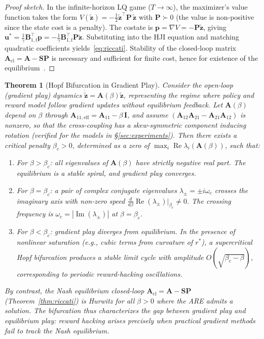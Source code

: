 \documentclass[10pt]{article}
\newcommand{\bz}{\bm{z}}
\newcommand{\bu}{\bm{u}}
\newcommand{\bp}{\bm{p}}
\newcommand{\bA}{\bm{A}}
\newcommand{\bB}{\bm{B}}
\newcommand{\bP}{\bm{P}}
\newcommand{\bI}{\bm{I}}
\newcommand{\bS}{\bm{S}}
\newtheorem{theorem}{Theorem}
\begin{document}
\begin{proof}[Proof sketch]
In the infinite-horizon LQ game ($T \to \infty$), the maximizer's value function takes the form $V(\tilde{\bz}) = -\tfrac{1}{2}\tilde{\bz}^\top \bP\,\tilde{\bz}$ with $\bP \succ 0$ (the value is non-positive since the state cost is a penalty).
The costate is $\bp = \nabla V = -\bP\tilde{\bz}$, giving $\bu^* = \tfrac{1}{\gamma}\bB_{1,\mathrm{f}}^\top \bp = -\tfrac{1}{\gamma}\bB_{1,\mathrm{f}}^\top \bP\tilde{\bz}$.
Substituting into the HJI equation and matching quadratic coefficients yields~\eqref{eq:riccati}.
Stability of the closed-loop matrix $\bA_{\mathrm{cl}} = \bA - \bS\bP$ is necessary and sufficient for finite cost, hence for existence of the equilibrium~\citep{basar1999dynamic}.
\end{proof}

\begin{theorem}[Hopf Bifurcation in Gradient Play]
\label{thm:hopf}
Consider the \emph{open-loop} (gradient play) dynamics $\dot{\tilde{\bz}} = \bA(\beta)\tilde{\bz}$, representing the regime where policy and reward model follow gradient updates without equilibrium feedback.
Let $\bA(\beta)$ depend on $\beta$ through $\bA_{11,\mathrm{eff}} = \bA_{11} - \beta\,\bI$, and assume $(\bA_{12}\bA_{21} - \bA_{21}\bA_{12})$ is nonzero, so that the cross-coupling has a skew-symmetric component inducing rotation (verified for the models in \S\ref{sec:experiments}).
Then there exists a critical penalty $\beta_c > 0$, determined as a zero of $\max_i \operatorname{Re}\lambda_i(\bA(\beta))$, such that:
\begin{enumerate}[leftmargin=1.5em,itemsep=1pt]
  \item For $\beta > \beta_c$: all eigenvalues of $\bA(\beta)$ have strictly negative real part.
    The equilibrium is a stable spiral, and gradient play converges.
  \item For $\beta = \beta_c$: a pair of complex conjugate eigenvalues $\lambda_\pm = \pm i\omega_c$ crosses the imaginary axis with non-zero speed $\frac{d}{d\beta}\operatorname{Re}(\lambda_\pm)\big|_{\beta_c} \neq 0$.
    The crossing frequency is $\omega_c = |\operatorname{Im}(\lambda_\pm)|$ at $\beta = \beta_c$.
  \item For $\beta < \beta_c$: gradient play diverges from equilibrium. In the presence of nonlinear saturation (e.g., cubic terms from curvature of $r^*$), a supercritical Hopf bifurcation produces a stable limit cycle with amplitude $O(\sqrt{\beta_c - \beta})$, corresponding to periodic \emph{reward-hacking oscillations}.
\end{enumerate}
By contrast, the Nash equilibrium closed-loop $\bA_{\mathrm{cl}} = \bA - \bS\bP$ (Theorem~\ref{thm:riccati}) is Hurwitz for all $\beta > 0$ where the ARE admits a solution.
The bifurcation thus characterizes the gap between gradient play and equilibrium play: reward hacking arises precisely when practical gradient methods fail to track the Nash equilibrium.
\end{theorem}
\end{document}
